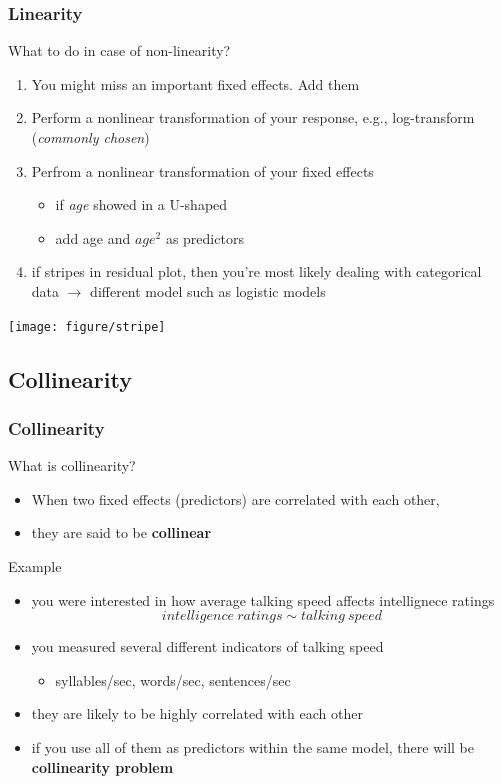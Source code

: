\documentclass{beamer}\usepackage[]{graphicx}\usepackage[]{color}
\begin{document}
\begin{frame}
\frametitle{Linearity}
What to do in case of non-linearity?
\begin{enumerate}
\item You might miss an important fixed effects. Add them
\item Perform a \alert{nonlinear transformation} of your response, e.g., log-transform (\textit{commonly chosen})
\item Perfrom a nonlinear transformation of your fixed effects
	\begin{itemize}
	\item if \textit{age} showed in a U-shaped
	\item add age and $age^2$ as predictors
	\end{itemize}	
\item if stripes in residual plot, then you're most likely dealing with \alert{categorical data} $\rightarrow$ different model such as logistic models
\end{enumerate}
\begin{center}
\texttt{[image: figure/stripe]}
\end{center}
\end{frame}

\subsection{Collinearity}
\begin{frame}
\frametitle{Collinearity}
What is collinearity?
\begin{itemize}
\item When two fixed effects (predictors) are \alert{correlated with} each other,
\item they are said to be \textbf{collinear}
\end{itemize}

Example
\begin{itemize}
\item you were interested in how average talking speed affects intellignece ratings
\begin{displaymath}
intelligence\ ratings \sim talking\ speed
\end{displaymath}
\item you measured several different indicators of talking speed
	\begin{itemize}
	\item syllables/sec, words/sec, sentences/sec
	\end{itemize}
\item they are likely to be highly correlated with each other
\item if you use all of them as predictors within the same model, there will be \textbf{collinearity problem}
\end{itemize}
\end{frame}
\end{document}
